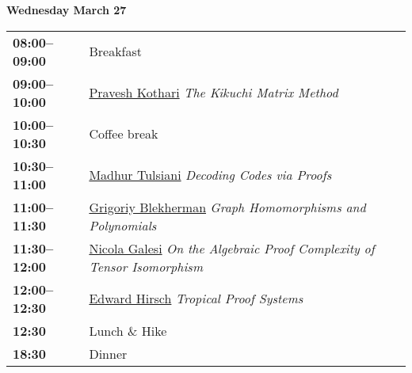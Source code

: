 \documentclass[11pt]{article}
\newcommand{\scheduletablewidth}{5.06in}
\begin{document}
\noindent\begin{minipage}{\textwidth}
\begin{center} {\bf\large Wednesday March 27} \end{center}
\begin{tabular}{ p{0.9in} p{\scheduletablewidth} }

  {\bf 08:00--09:00}  & Breakfast\\

  {\bf 09:00--10:00} & \hyperref[Kothari]{Pravesh Kothari}
  {\em The Kikuchi Matrix Method} \\
  
  {\bf 10:00--10:30} & {Coffee break} \\
  
  {\bf 10:30--11:00} & \hyperref[Tulsiani]{Madhur Tulsiani}
  {\em Decoding Codes via Proofs} \\
  
  {\bf 11:00--11:30} & \hyperref[Blekherman]{Grigoriy Blekherman}
  {\em Graph Homomorphisms and Polynomials} \\
  
  {\bf 11:30--12:00} & \hyperref[Galesi]{Nicola Galesi}
  {\em On the Algebraic Proof Complexity of Tensor Isomorphism} \\
  
  {\bf 12:00--12:30} & \hyperref[Hirsch]{Edward Hirsch}
  {\em Tropical Proof Systems} \\
  
  
  
  {\bf 12:30%
  } &  Lunch \& Hike\\

  {\bf 18:30%
  } & Dinner \\
\end{tabular}
\end{minipage}
\end{document}
